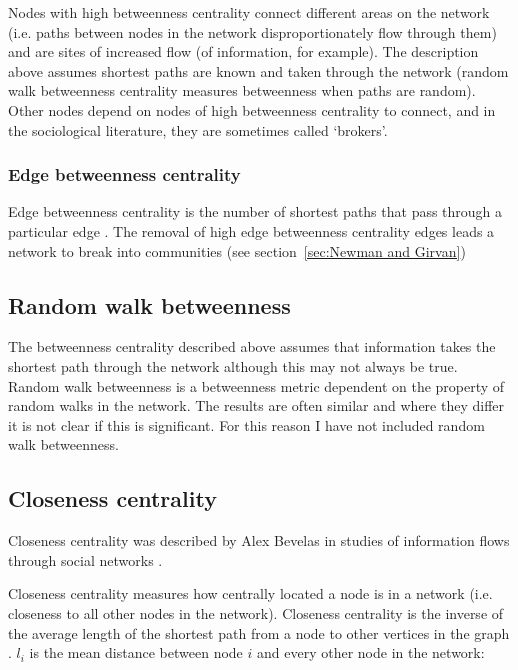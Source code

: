 Nodes with high betweenness centrality connect different areas on the network (i.e. paths between nodes in the network disproportionately flow through them) and are sites of increased flow (of information, for example). The description above assumes shortest paths are known and taken through the network\cite{borgatti2005centrality}  (random walk betweenness centrality measures betweenness when paths are random). Other nodes depend on nodes of high betweenness centrality to connect, and in the sociological literature, they are sometimes called  `brokers'\cite{newman2018networks}. 



\subsubsection{Edge betweenness centrality}
 Edge betweenness centrality is the number of shortest paths that pass through a particular edge \cite{girvan2002community}. The removal of high edge betweenness centrality edges leads a network to break into communities (see section~\ref{sec:Newman and Girvan})

\subsection{Random walk betweenness}
\label{sec: random walk betweenness}
The betweenness centrality described above assumes that information takes the shortest path through the network although this may not always be true. Random walk betweenness is a betweenness metric dependent on the property of random walks in the network. The results are often similar and where they differ it is not clear if this is significant\cite{newman2018networks}. For this reason I have not included random walk betweenness. 

\subsection{Closeness centrality}
\label{sec:closenesscentrality}
Closeness centrality was described by Alex Bevelas in studies of information flows through social networks \cite{bavelas1948mathematical}. 

Closeness centrality measures how centrally located a node is in a network (i.e. closeness to all other nodes in the network). Closeness centrality is the inverse of the average length of the shortest path from a node to other vertices in the graph \cite{freeman1978centrality}. $l_i$ is the mean distance between node $i$ and every other node in the network:

